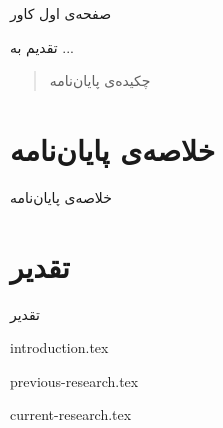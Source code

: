 \documentclass[a4paper,11px]{article}
\begin{document}
صفحه‌ی اول کاور

\newpage


تقدیم به ...

\newpage


\begin{abstract}
چکیده‌ی پایان‌نامه
\end{abstract}
\newpage

\section*{
خلاصه‌ی پایان‌نامه
}

خلاصه‌ی پایان‌نامه
\newpage

\section*{
تقدیر
}

تقدیر
\newpage


\setcounter{secnumdepth}{2}
\setcounter{tocdepth}{2}
\tableofcontents

\newpage


\listoffigures

\newpage
 
 
\listoftables

\newpage

{introduction.tex}

\newpage


{previous-research.tex}

\newpage


{current-research.tex}

\newpage
\end{document}
